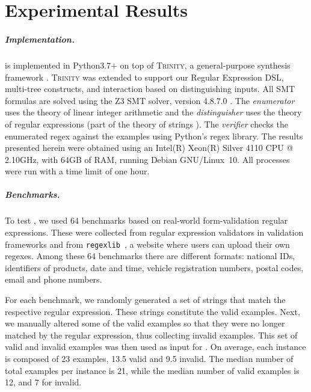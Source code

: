 \chapter{Experimental Results}

\paragraph{Implementation.}
\Forest{} is implemented in Python3.7+ on top of \textsc{Trinity}, a general-purpose synthesis framework \cite{trinity19}. \textsc{Trinity} was extended to support our Regular Expression \ac{DSL}, multi-tree constructs, and interaction based on distinguishing inputs. All \ac{SMT} formulas are solved using the Z3 SMT solver, version  4.8.7.0 \cite{z3}. The \textit{enumerator} uses the theory of linear integer arithmetic and the \textit{distinguisher} uses the theory of regular expressions (part of the theory of strings \cite{z3str317}). The \textit{verifier} checks the enumerated regex against the examples using Python's regex library.
%
The results presented herein were obtained using an Intel(R) Xeon(R) Silver 4110 CPU @ 2.10GHz, with 64GB of RAM, running Debian GNU/Linux~10. All processes were run with a time limit of one hour.

\paragraph{Benchmarks.} To test \Forest{}, we used 64 benchmarks based on real-world form-validation regular expressions. These were collected from regular expression validators in validation frameworks and from \texttt{regexlib}~\cite{regexlib}, a website where users can upload their own regexes. Among these 64 benchmarks there are different formats: national IDs, identifiers of products, date and time, vehicle registration numbers, postal codes, email and phone numbers.

For each benchmark, we randomly generated a set of strings that match the respective regular expression. These strings constitute the valid examples. Next, we manually altered some of the valid examples so that they were no longer matched by the regular expression, thus collecting invalid examples. This set of valid and invalid examples was then used as input for \Forest{}.
On average, each instance is composed of 23 examples, 13.5 valid and 9.5 invalid. The median number of total examples per instance is 21, while the median number of valid examples is 12, and 7 for invalid.

